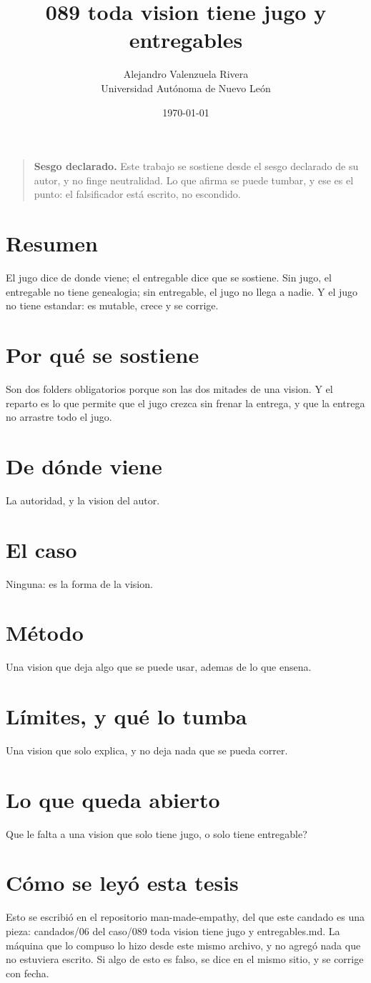 \documentclass[11pt,a4paper]{article}
\title{089 toda vision tiene jugo y entregables}
\author{Alejandro Valenzuela Rivera\\\small Universidad Autónoma de Nuevo León}
\date{\today}
\begin{document}
\maketitle

\begin{quote}
\textbf{Sesgo declarado.} Este trabajo se sostiene desde el sesgo declarado de su autor, y no finge neutralidad. Lo que afirma se puede tumbar, y ese es el punto: el falsificador está escrito, no escondido.
\end{quote}

\section*{Resumen}
El jugo dice de donde viene; el entregable dice que se sostiene. Sin jugo, el entregable no tiene genealogia; sin entregable, el jugo no llega a nadie. Y el jugo no tiene estandar: es mutable, crece y se corrige.

\section{Por qué se sostiene}
Son dos folders obligatorios porque son las dos mitades de una vision. Y el reparto es lo que permite que el jugo crezca sin frenar la entrega, y que la entrega no arrastre todo el jugo.

\section{De dónde viene}
La autoridad, y la vision del autor.

\section{El caso}
Ninguna: es la forma de la vision.

\section{Método}
Una vision que deja algo que se puede usar, ademas de lo que ensena.

\section{Límites, y qué lo tumba}
Una vision que solo explica, y no deja nada que se pueda correr.

\section{Lo que queda abierto}
\textquestiondown{}Que le falta a una vision que solo tiene jugo, o solo tiene entregable?

\section*{Cómo se leyó esta tesis}
Esto se escribió en el repositorio man-made-empathy, del que este candado es una pieza: candados/06 del caso/089 toda vision tiene jugo y entregables.md. La máquina que lo compuso lo hizo desde este mismo archivo, y no agregó nada que no estuviera escrito. Si algo de esto es falso, se dice en el mismo sitio, y se corrige con fecha.
\end{document}
